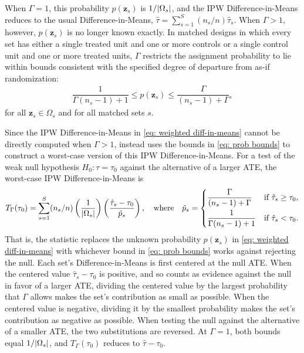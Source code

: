 \documentclass[
  12pt,
  leqno]{article}
\DeclarePairedDelimiter\abs{\lvert}{\rvert}
\begin{document}
When \(\Gamma = 1\), this probability \(p(\bm{z}_s)\) is
\(1/\abs{\Omega_s}\), and the IPW Difference-in-Means reduces to the
usual Difference-in-Means,
\(\hat{\tau} = \sum_{s=1}^S (n_s/n)\hat{\tau}_s\). When \(\Gamma > 1\),
however, \(p(\bm{z}_s)\) is no longer known exactly. In matched designs
in which every set has either a single treated unit and one or more
controls or a single control unit and one or more treated units,
\(\Gamma\) restricts the assignment probability to lie within bounds
consistent with the specified degree of departure from as-if
randomization: \begin{align} \label{eq: prob bounds}
\dfrac{1}{\Gamma (n_s - 1) + 1} \leq p(\bm{z}_s) \leq \dfrac{\Gamma}{(n_s - 1) + \Gamma},
\end{align} for all \(\bm{z}_s \in \Omega_s\) and for all matched sets
\(s\).

Since the IPW Difference-in-Means in \eqref{eq: weighted diff-in-means}
cannot be directly computed when \(\Gamma > 1\), \citet{fogarty2023}
instead uses the bounds in \eqref{eq: prob bounds} to construct a
worst-case version of this IPW Difference-in-Means. For a test of the
weak null hypothesis \(H_0\colon \tau = \tau_0\) against the alternative
of a larger ATE, the worst-case IPW Difference-in-Means is
\begin{align} \label{eq: worst-case IPW}
T_{\Gamma}(\tau_0) = \sum \limits_{s = 1}^S (n_s/n) \left(\frac{1}{\abs{\Omega_s}}\right)\left(\frac{\hat{\tau}_s - \tau_0}{\tilde{p}_s}\right), \quad \text{where} \quad \tilde{p}_s =
\begin{cases}
\dfrac{\Gamma}{(n_s - 1) + \Gamma} & \text{if } \hat{\tau}_s \geq \tau_0, \\[2ex] \dfrac{1}{\Gamma (n_s - 1) + 1} & \text{if } \hat{\tau}_s < \tau_0.
\end{cases}
\end{align} That is, the statistic replaces the unknown probability
\(p(\bm{z}_s)\) in \eqref{eq: weighted diff-in-means} with whichever
bound in \eqref{eq: prob bounds} works against rejecting the null. Each
set's Difference-in-Means is first centered at the null ATE. When the
centered value \(\hat{\tau}_s - \tau_0\) is positive, and so counts as
evidence against the null in favor of a larger ATE, dividing the
centered value by the largest probability that \(\Gamma\) allows makes
the set's contribution as small as possible. When the centered value is
negative, dividing it by the smallest probability makes the set's
contribution as negative as possible. When testing the null against the
alternative of a smaller ATE, the two substitutions are reversed. At
\(\Gamma = 1\), both bounds equal \(1/\abs{\Omega_s}\), and
\(T_{\Gamma}(\tau_0)\) reduces to \(\hat{\tau} - \tau_0\).
\end{document}

